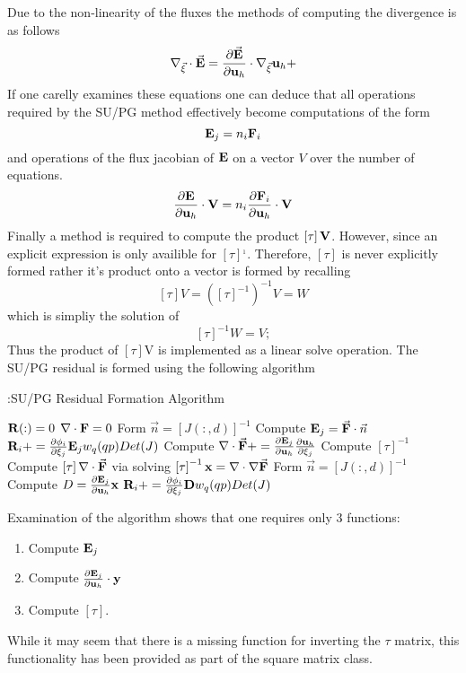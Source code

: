 \documentclass[letterpaper]{article}
\newcommand{\pd}[2]{\frac{ \partial #1}{\partial #2}}
\newcommand{\paren}[1]{\left( #1 \right)}
\newcommand{\sparen}[1]{\left[ #1 \right]}
\newcommand{\hb}[1]{ {\bf #1}_{h} } %
\begin{document}
Due to the non-linearity of the fluxes the methods of computing the divergence is as follows
\begin{equation}
\nabla_{\vec{\xi}}\cdot \vec{\bf E} = \pd{\vec{\bf E}}{\hb{u}}\cdot \nabla_{\vec{\xi}}\hb{u} + 
\end{equation}
If one carelly examines these equations one can deduce that all operations required by the SU/PG method effectively become computations of the form
\begin{equation}
{\bf E}_{j} = n_{i}{\bf F}_{i}
\end{equation}
and operations of the flux jacobian of ${\bf E}$ on a vector $V$ over the number of equations.
\begin{equation}
\pd{{\bf E}}{\hb{u}}\cdot {\bf V} = n_{i}\pd{{\bf F}_{i}}{\hb{u}} \cdot {\bf V}
\end{equation}
Finally a method is required to compute the product $\sparen{\tau} {\bf V}$.  However, since an explicit expression is only availible for $\sparen{\tau}^{_1}$.  Therefore, $\sparen{\tau}$ is never explicitly formed rather it's product onto a vector is formed by recalling
\begin{equation}
\sparen{\tau}V = \paren{\sparen{\tau}^{-1}}^{-1}V = W
\end{equation}
which is simpliy the solution of 
\begin{equation}
\sparen{\tau}^{-1}W = V;
\end{equation}
Thus the product of $\sparen{\tau}$V is implemented as a linear solve operation.  The SU/PG residual is formed using the following algorithm
\begin{algorithm}[!h]
\caption{:SU/PG Residual Formation Algorithm}
\label{algsupg}
\begin{algorithmic}
\STATE ${\bf R}(:) = 0$ 
\STATE $\nabla \cdot {\bf F} = 0$
\STATE Form $\vec{n} = \sparen{J(:,d)}^{-1}$
\STATE Compute ${\bf E}_{j} = \vec{{\bf F}}\cdot \vec{n}$
\STATE ${\bf R}_{i} += \pd{\phi_{i}}{\xi_{j}}{\bf E}_{j}w_{q}(qp)Det(J)$
\ENDFOR
\STATE Compute $\nabla \cdot \vec{\bf F} += \pd{{\bf E}_{j}}{\hb{u}}\pd{\hb{u}}{\xi_{j}}$ 
\ENDFOR
\STATE Compute $\sparen{\tau}^{-1}$
\STATE Compute $\sparen{\tau}\nabla \cdot \vec{\bf F}$ via solving $\sparen{\tau}^{-1}{\bf x} = \nabla \cdot \nabla\vec{\bf F}$
\STATE Form $\vec{n} = \sparen{J(:,d)}^{-1}$
\STATE Compute $D = \pd{{\bf E}_{j}}{\hb{u}}{\bf x}$
\STATE ${\bf R}_{i} += \pd{\phi_{i}}{\xi_{j}}{\bf D}w_{q}(qp)Det(J)$
\ENDFOR
\ENDFOR
\ENDFOR
\end{algorithmic}
\end{algorithm}
 
Examination of the algorithm shows that one requires only 3 functions:
\begin{enumerate}
\item Compute ${\bf E}_{j} $
\item Compute $\pd{{\bf E}_{j}}{\hb{u}}\cdot {\bf y}$
\item Compute $\sparen{\tau}$. 
\end{enumerate}
While it may seem that there is a missing function for inverting the $\tau$ matrix, this functionality has been provided as part of the square matrix class.  
\end{document}
